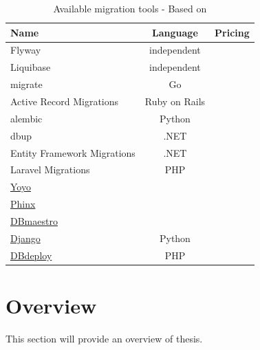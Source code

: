 \begin{table}[h]
	\centering
	\begin{tabularx}{8cm}{X|c|l}
		Name & Language & Pricing \\ \hline
		Flyway & independent\\
		Liquibase & independent\\
		migrate & Go  \\
		Active Record Migrations & Ruby on Rails \\
		alembic & Python \\
		dbup & .NET \\
		Entity Framework Migrations & .NET \\
		Laravel Migrations & PHP \\
		\href{https://ollycope.com/software/yoyo/latest/}{Yoyo} &  \\
		\href{https://book.cakephp.org/phinx/0/en/migrations.html}{Phinx} &  \\
		\href{https://www.dbmaestro.com/for-devops}{DBmaestro} &  \\
		\href{https://docs.djangoproject.com/en/1.11/topics/migrations/}{Django} & Python \\
		\href{http://dbdeploy.com}{DBdeploy} & PHP \\
	\end{tabularx}
	\caption{Available migration tools - Based on \cite{}}
	\label{tab:migration_tools}
\end{table}




\section{Overview}%
This section will provide an overview of thesis.


\newpage